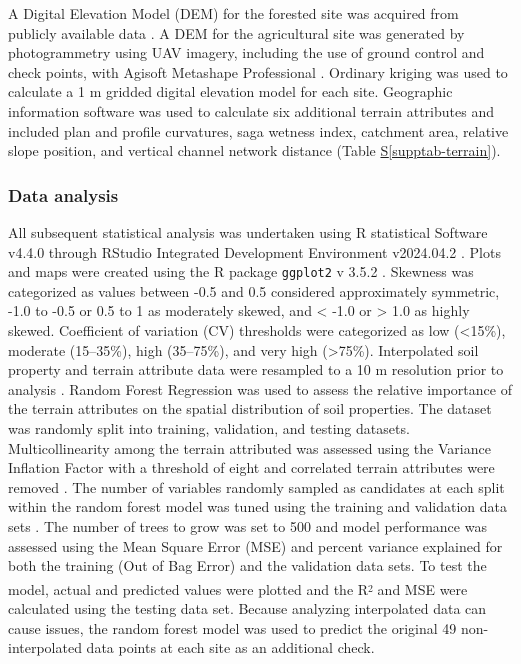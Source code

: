 \documentclass[
  number]{elsarticle}
\newcommand*\quartosupptabref[1]{Table \hyperref[#1]{S\ref{#1}}}
\begin{document}
A Digital Elevation Model (DEM) for the forested site was acquired from
publicly available data \citep{naturalresourcescanada2024}. A DEM for
the agricultural site was generated by photogrammetry using UAV imagery,
including the use of ground control and check points, with Agisoft
Metashape Professional \citep[v1.8.2][]{agisoft2021}. Ordinary kriging
was used to calculate a 1 m gridded digital elevation model for each
site. Geographic information software \citep[SAGA v2.1.4][]{conrad2015}
was used to calculate six additional terrain attributes and included
plan and profile curvatures, saga wetness index, catchment area,
relative slope position, and vertical channel network distance
(\quartosupptabref{supptab-terrain}).

\subsubsection{Data analysis}\label{data-analysis}

All subsequent statistical analysis was undertaken using R statistical
Software v4.4.0 \citep{rcoreteam2024} through RStudio Integrated
Development Environment v2024.04.2 \citep{rstudio2024}. Plots and maps
were created using the R package \texttt{ggplot2} v 3.5.2
\citep{wickham2016}. Skewness was categorized as values between -0.5 and
0.5 considered approximately symmetric, -1.0 to -0.5 or 0.5 to 1 as
moderately skewed, and \textless{} -1.0 or \textgreater{} 1.0 as highly
skewed. Coefficient of variation (CV) thresholds were categorized as low
(\textless15\%), moderate (15--35\%), high (35--75\%), and very high
(\textgreater75\%). Interpolated soil property and terrain attribute
data were resampled to a 10 m resolution prior to analysis
\citep[\texttt{terra} v1.8.29][]{hijmans2024}. Random Forest Regression
\citep[\texttt{randomForest} v4.7.1.2][]{liaw2002} was used to assess
the relative importance of the terrain attributes on the spatial
distribution of soil properties. The dataset was randomly split into
training, validation, and testing datasets. Multicollinearity among the
terrain attributed was assessed using the Variance Inflation Factor with
a threshold of eight and correlated terrain attributes were removed
\citep[\texttt{usdm} v2.1.7][]{Naimi2014}. The number of variables
randomly sampled as candidates at each split within the random forest
model was tuned using the training and validation data sets
\citep[\texttt{caret} v7.0.1][]{kuhn2008}. The number of trees to grow
was set to 500 and model performance was assessed using the Mean Square
Error (MSE) and percent variance explained for both the training (Out of
Bag Error) and the validation data sets. To test the model, actual and
predicted values were plotted and the
R\textsuperscript{\textsubscript{2}} and MSE were calculated using the
testing data set. Because analyzing interpolated data can cause issues,
the random forest model was used to predict the original 49
non-interpolated data points at each site as an additional check.
\end{document}

